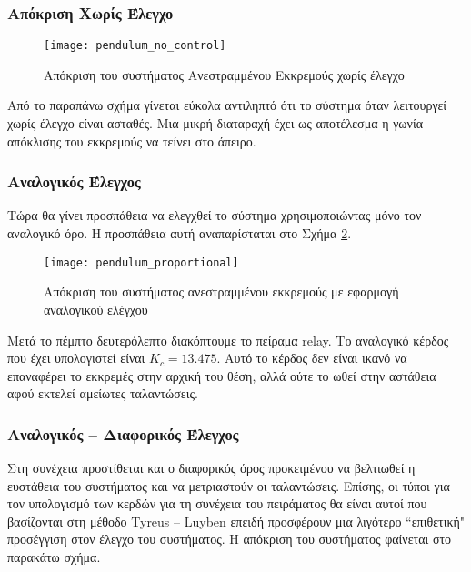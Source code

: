 \subsubsection{Απόκριση Χωρίς Έλεγχο}

\begin{figure}[h]
  \centering
  \texttt{[image: pendulum\_no\_control]}
  \caption{Απόκριση του συστήματος Ανεστραμμένου Εκκρεμούς χωρίς έλεγχο}
  \label{fig:pendulum_no_control}
\end{figure}

Από το παραπάνω σχήμα γίνεται εύκολα αντιληπτό ότι το σύστημα όταν λειτουργεί χωρίς έλεγχο είναι ασταθές. Μια μικρή διαταραχή έχει ως αποτέλεσμα η γωνία απόκλισης του εκκρεμούς να τείνει στο άπειρο.

\subsubsection{Αναλογικός Έλεγχος}

Τώρα θα γίνει προσπάθεια να ελεγχθεί το σύστημα χρησιμοποιώντας μόνο τον αναλογικό όρο. Η προσπάθεια αυτή αναπαρίσταται στο Σχήμα \ref{fig:pendulum_proportional}.

\begin{figure}[h]
  \centering
  \texttt{[image: pendulum\_proportional]}
  \caption{Απόκριση του συστήματος ανεστραμμένου εκκρεμούς με εφαρμογή αναλογικού ελέγχου}
  \label{fig:pendulum_proportional}
\end{figure}
Μετά το πέμπτο δευτερόλεπτο διακόπτουμε το πείραμα relay. Το αναλογικό κέρδος που έχει υπολογιστεί είναι $K_c=13.475$. Αυτό το κέρδος δεν είναι ικανό να επαναφέρει το εκκρεμές στην αρχική του θέση, αλλά ούτε το ωθεί στην αστάθεια αφού εκτελεί αμείωτες ταλαντώσεις. 

\subsubsection{Αναλογικός  --  Διαφορικός Έλεγχος}

Στη συνέχεια προστίθεται και ο διαφορικός όρος προκειμένου να βελτιωθεί η ευστάθεια του συστήματος και να μετριαστούν οι ταλαντώσεις. Επίσης, οι τύποι για τον υπολογισμό των κερδών για τη συνέχεια του πειράματος θα είναι αυτοί που βασίζονται στη μέθοδο Tyreus -- Luyben επειδή προσφέρουν μια λιγότερο ``επιθετική" προσέγγιση στον έλεγχο του συστήματος. Η απόκριση του συστήματος φαίνεται στο παρακάτω σχήμα.

